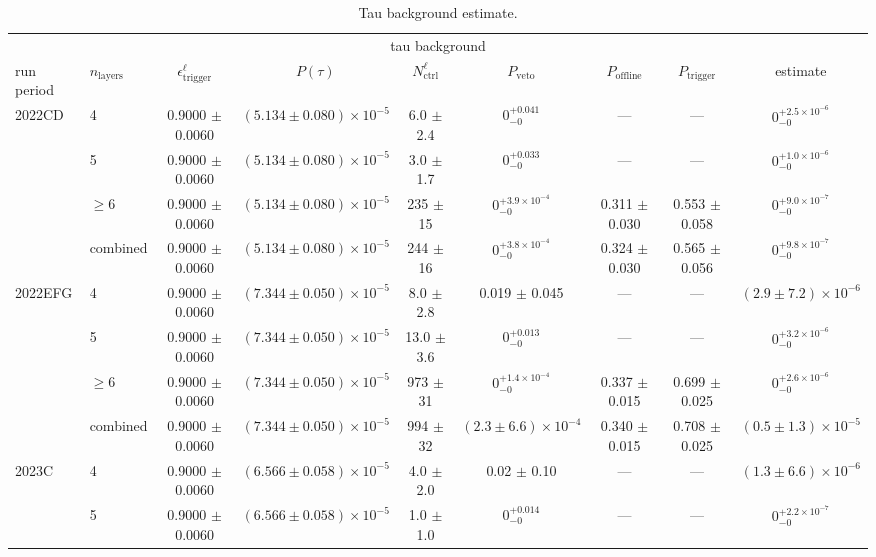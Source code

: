 \begin{table}
\centering
\caption{Tau background estimate.}
\label{tab:lepton_background_estimate}
\begin{tiny}
\begin{tabular}{llccccccc}
\hline
\multicolumn{9}{c}{tau background} \\
run period & $n_{\mathrm{layers}}$ & $\epsilon_{\mathrm{trigger}}^{\ell}$ & $P(\tau)$ & $N_{\mathrm{ctrl}}^{\ell}$ & $P_{\mathrm{veto}}$ & $P_{\mathrm{offline}}$ & $P_{\mathrm{trigger}}$ & estimate \\
\hline
\multirow{4}{*}{2022CD} & 4 & 0.9000 $\pm$ 0.0060 & $(5.134 \pm 0.080) \times 10^{-5}$ & 6.0 $\pm$ 2.4 & $0^{+0.041}_{-0}$ & --- & --- & $0^{+2.5 \times 10^{-6}}_{-0}$ \\
 & 5 & 0.9000 $\pm$ 0.0060 & $(5.134 \pm 0.080) \times 10^{-5}$ & 3.0 $\pm$ 1.7 & $0^{+0.033}_{-0}$ & --- & --- & $0^{+1.0 \times 10^{-6}}_{-0}$ \\
 & $\geq 6$ & 0.9000 $\pm$ 0.0060 & $(5.134 \pm 0.080) \times 10^{-5}$ & 235 $\pm$ 15 & $0^{+3.9 \times 10^{-4}}_{-0}$ & 0.311 $\pm$ 0.030 & 0.553 $\pm$ 0.058 & $0^{+9.0 \times 10^{-7}}_{-0}$ \\
 & combined & 0.9000 $\pm$ 0.0060 & $(5.134 \pm 0.080) \times 10^{-5}$ & 244 $\pm$ 16 & $0^{+3.8 \times 10^{-4}}_{-0}$ & 0.324 $\pm$ 0.030 & 0.565 $\pm$ 0.056 & $0^{+9.8 \times 10^{-7}}_{-0}$ \\
\hline
\multirow{4}{*}{2022EFG} & 4 & 0.9000 $\pm$ 0.0060 & $(7.344 \pm 0.050) \times 10^{-5}$ & 8.0 $\pm$ 2.8 & 0.019 $\pm$ 0.045 & --- & --- & $(2.9 \pm 7.2) \times 10^{-6}$ \\
 & 5 & 0.9000 $\pm$ 0.0060 & $(7.344 \pm 0.050) \times 10^{-5}$ & 13.0 $\pm$ 3.6 & $0^{+0.013}_{-0}$ & --- & --- & $0^{+3.2 \times 10^{-6}}_{-0}$ \\
 & $\geq 6$ & 0.9000 $\pm$ 0.0060 & $(7.344 \pm 0.050) \times 10^{-5}$ & 973 $\pm$ 31 & $0^{+1.4 \times 10^{-4}}_{-0}$ & 0.337 $\pm$ 0.015 & 0.699 $\pm$ 0.025 & $0^{+2.6 \times 10^{-6}}_{-0}$ \\
 & combined & 0.9000 $\pm$ 0.0060 & $(7.344 \pm 0.050) \times 10^{-5}$ & 994 $\pm$ 32 & $(2.3 \pm 6.6) \times 10^{-4}$ & 0.340 $\pm$ 0.015 & 0.708 $\pm$ 0.025 & $(0.5 \pm 1.3) \times 10^{-5}$ \\
\hline
\multirow{4}{*}{2023C} & 4 & 0.9000 $\pm$ 0.0060 & $(6.566 \pm 0.058) \times 10^{-5}$ & 4.0 $\pm$ 2.0 & 0.02 $\pm$ 0.10 & --- & --- & $(1.3 \pm 6.6) \times 10^{-6}$ \\
 & 5 & 0.9000 $\pm$ 0.0060 & $(6.566 \pm 0.058) \times 10^{-5}$ & 1.0 $\pm$ 1.0 & $0^{+0.014}_{-0}$ & --- & --- & $0^{+2.2 \times 10^{-7}}_{-0}$ \\

\end{tabular}
\end{tiny}
\end{table}
